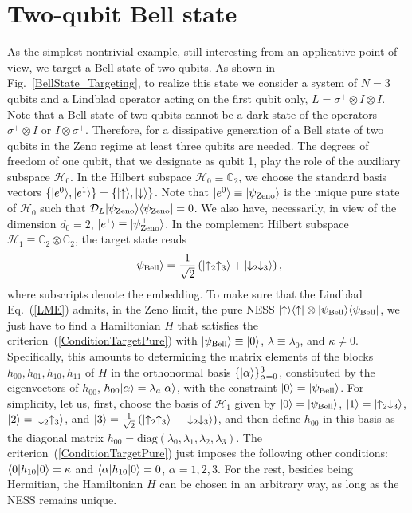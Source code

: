 \documentclass[aps,pra,letterpaper,twocolumn,showpacs,superscriptaddress,floatfix,longbibliography]{revtex4-1}
\begin{document}
\section{Two-qubit Bell state}
As the simplest nontrivial example, still interesting from an
applicative point of view, we target a Bell state of two qubits.  As
shown in Fig.~\ref{BellState_Targeting}, to realize this state we
consider a system of $N=3$ qubits and a Lindblad operator acting on
the first qubit only, $L=\sigma^+ \otimes I \otimes I$.  Note that a
Bell state of two qubits cannot be a dark state of the operators
$\sigma^{+} \otimes I$ or $I \otimes \sigma^{+}$.  Therefore, for a
dissipative generation of a Bell state of two qubits in the Zeno
regime at least three qubits are needed. The degrees of freedom of one
qubit, that we designate as qubit 1, play the role of the auxiliary
subspace $\mathcal{H}_0$.  In the Hilbert subspace $\mathcal{H}_0
\equiv \mathbb{C}_2$, we choose the standard basis vectors $\{|e^{0}
\rangle,|e^{1} \rangle\}= \{|{\uparrow}\rangle,|{\downarrow}\rangle\}$.  Note
that $|{e^0}\rangle \equiv |{\psi_{\rm{Zeno}}}\rangle$ is the unique pure
state of $\mathcal{H}_0$ such that $\mathcal{D}_L
|{\psi_{\rm{Zeno}}}\rangle\langle{\psi_{\rm{Zeno}}}|=0$. We also have,
necessarily, in view of the dimension $d_0=2$, $|{e^1}\rangle \equiv
|{\psi_{\rm{Zeno}}^\perp}\rangle$.  In the complement Hilbert subspace
$\mathcal{H}_1 \equiv {\mathbb{C}_2} \otimes \mathbb{C}_2$, the target
state reads
\begin{align}
  |{\psi_\mathrm{Bell}}\rangle=\frac{1}{\sqrt{2}} \left( |{\uparrow_2
      \uparrow_3}\rangle + |{\downarrow_2 \downarrow_3}\rangle\right),
\end{align}
where subscripts denote the embedding.  To make sure that the Lindblad
Eq.~(\ref{LME}) admits, in the Zeno limit, the pure NESS
$|{\uparrow}\rangle\langle{\uparrow}| \otimes
|{\psi_{\rm{Bell}}}\rangle\langle{\psi_{\rm{Bell}}}|$, we just have to find a
Hamiltonian $H$ that satisfies the
criterion~(\ref{ConditionTargetPure}) with $|{\psi_{\rm{Bell}}}\rangle
\equiv |{0}\rangle$, $\lambda \equiv \lambda_0$, and $\kappa \neq 0$.
Specifically, this amounts to determining the matrix elements of the
blocks $h_{00},h_{01},h_{10},h_{11}$ of $H$ in the orthonormal basis
$\{|{\alpha}\rangle\}_{\alpha=0}^{3}$, constituted by the eigenvectors of
$h_{00}$, $h_{00} |{\alpha}\rangle = \lambda_a |{\alpha}\rangle$, with the
constraint $|{0}\rangle=|{\psi_{\rm{Bell}}}\rangle$.  For simplicity, let us,
first, choose the basis of $\mathcal{H}_1$ given by
$|{0}\rangle=|{\psi_{\rm{Bell}}}\rangle$,
$|{1}\rangle=|{\uparrow_2\downarrow_3}\rangle$,
$|{2}\rangle=|{\downarrow_2\uparrow_3}\rangle$, and $|{3}\rangle=
\frac{1}{\sqrt{2}} \left( |{\uparrow_2 \uparrow_3}\rangle -
  |{\downarrow_2 \downarrow_3}\rangle\right)$, and then define $h_{00}$ in
this basis as the diagonal matrix
$h_{00}=\mathrm{diag}(\lambda_0,\lambda_1,\lambda_2,\lambda_3)$. The
criterion~(\ref{ConditionTargetPure}) just imposes the following other
conditions: $\langle{0}|h_{10}|{0}\rangle=\kappa$ and
$\langle{\alpha}|h_{10}|{0}\rangle=0$, $\alpha=1,2,3$. For the rest, besides
being Hermitian, the Hamiltonian $H$ can be chosen in an arbitrary
way, as long as the NESS remains unique.
\end{document}
